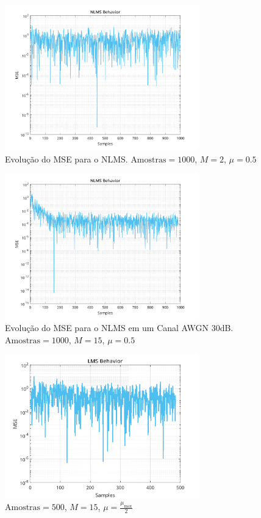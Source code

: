 \documentclass[a4paper,10pt]{article}
\begin{document}
\begin{enumerate}
				\begin{figure}[H]
					\centering
					\includegraphics[width=0.75\textwidth]{figs/nlms_mse.png}
					\caption{Evolução do MSE para o NLMS. $\text{Amostras} = 1000$, $M = 2$, $\mu = 0.5$}
					\label{fig:nlms_mse}
				\end{figure}

				\begin{figure}[H]
					\centering
					\includegraphics[width=0.75\textwidth]{figs/nlms_awgn.png}
					\caption{Evolução do MSE para o NLMS em um Canal AWGN 30dB. $\text{Amostras} = 1000$, $M = 15$, $\mu = 0.5$}
					\label{fig:nlms_awgn}
				\end{figure}

				\begin{figure}[H]
					\centering
					\includegraphics[width=0.75\textwidth]{figs/L3Q5_mu_2.png}
					\caption{$\text{Amostras} = 500$, $M = 15$, $\mu = \frac{\mu_{\text{max}}}{2}$}
					\label{fig:mu_2}
				\end{figure}


\end{enumerate}
\end{document}
